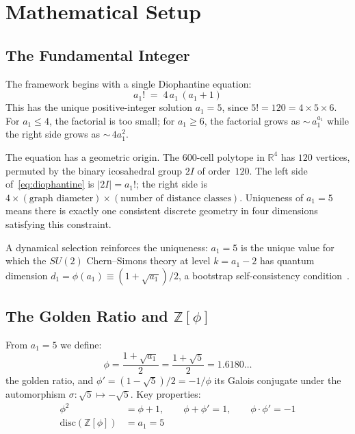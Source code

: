 \documentclass[12pt,a4paper]{article}
\theoremstyle{definition}
\begin{document}
\section{Mathematical Setup}
\label{sec:setup}

\subsection{The Fundamental Integer}

The framework begins with a single Diophantine equation:
\begin{equation}
\boxed{a_1! \;=\; 4\,a_1\,(a_1 + 1)}
\label{eq:diophantine}
\end{equation}
This has the unique positive-integer solution $a_1 = 5$, since $5! = 120 = 4 \times 5 \times 6$.  For $a_1 \leq 4$, the factorial is too small; for $a_1 \geq 6$, the factorial grows as ${\sim}\,a_1^{a_1}$ while the right side grows as ${\sim}\,4a_1^2$.

The equation has a geometric origin.  The 600-cell polytope in $\mathbb{R}^4$ has $120$ vertices, permuted by the binary icosahedral group $2I$ of order~$120$.  The left side of~\eqref{eq:diophantine} is $|2I| = a_1!$; the right side is $4 \times (\text{graph diameter}) \times (\text{number of distance classes})$.  Uniqueness of $a_1 = 5$ means there is exactly one consistent discrete geometry in four dimensions satisfying this constraint.

A dynamical selection reinforces the uniqueness: $a_1 = 5$ is the unique value for which the $SU(2)$ Chern--Simons theory at level $k = a_1 - 2$ has quantum dimension $d_1 = \phi(a_1) \equiv (1 + \sqrt{a_1})/2$, a bootstrap self-consistency condition~\cite{Anghelina2026}.

\subsection{The Golden Ratio and $\mathbb{Z}[\phi]$}

From $a_1 = 5$ we define:
\begin{equation}
\phi = \frac{1 + \sqrt{a_1}}{2} = \frac{1 + \sqrt{5}}{2} = 1.6180\ldots
\label{eq:phi}
\end{equation}
the golden ratio, and $\phi' = (1 - \sqrt{5})/2 = -1/\phi$ its Galois conjugate under the automorphism $\sigma: \sqrt{5} \mapsto -\sqrt{5}$.  Key properties:
\begin{align}
\phi^2 &= \phi + 1, \qquad \phi + \phi' = 1, \qquad \phi \cdot \phi' = -1 \\
\mathrm{disc}(\mathbb{Z}[\phi]) &= a_1 = 5
\end{align}
\end{document}
